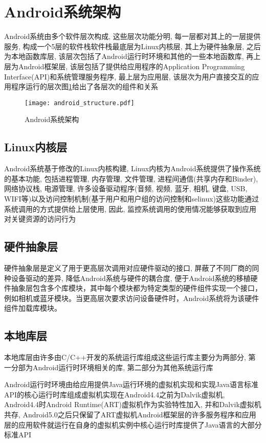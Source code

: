 \section{Android系统架构}
Android系统由多个软件层次构成, 这些层次功能分明, 每一层都对其上的一层提供服务, 构成一个5层的软件栈\juhao 软件栈最底层为Linux内核层, 其上为硬件抽象层, 之后为本地函数库层, 该层次包括了Android运行时环境和其他的一些本地函数库, 再上层为Android框架层, 该层包括了提供给应用程序的Application Programming Interface(API)和系统管理服务程序, 最上层为应用层, 该层次为用户直接交互的应用程序运行的层次\juhao  图\ref{androidStructure}给出了各层次的组件和关系\juhao
\begin{figure}[ht]
\centering
\texttt{[image: android\_structure.pdf]}
\caption{Android系统架构}
\label{androidStructure}
\end{figure}

\subsection*{Linux内核层} 
Android系统基于修改的Linux内核构建, Linux内核为Android系统提供了操作系统的基本功能, 包括进程管理, 内存管理, 文件管理, 进程间通信(共享内存和Binder), 网络协议栈, 电源管理, 许多设备驱动程序(音频, 视频, 蓝牙, 相机, 键盘, USB, WIFI等)以及访问控制机制(基于用户和用户组的访问控制和selinux)\juhao 这些功能通过系统调用的方式提供给上层使用, 因此, 监控系统调用的使用情况能够获取到应用对关键资源的访问行为\juhao

\subsection*{硬件抽象层}
硬件抽象层是定义了用于更高层次调用对应硬件驱动的接口, 屏蔽了不同厂商的同种设备驱动的差异, 降低Android系统与硬件的耦合度, 便于Android系统的移植\juhao 硬件抽象层包含多个库模块，其中每个模块都为特定类型的硬件组件实现一个接口，例如相机或蓝牙模块。当更高层次要求访问设备硬件时，Android系统将为该硬件组件加载库模块。

\subsection*{本地库层}
本地库层由许多由C/C++开发的系统运行库组成\juhao 这些运行库主要分为两部分, 第一分部为Android运行时环境相关的库, 第二部分为其他系统运行库\juhao 

Android运行时环境由给应用提供Java运行环境的虚拟机实现和实现Java语言标准API的核心运行时库组成\juhao 虚拟机实现在Android4.4之前为Dalvik虚拟机, Android4.4时Android Runtime(ART)虚拟机作为实验特性加入, 并和Dalvik虚拟机共存, Android5.0之后只保留了ART虚拟机\juhao Android框架层的许多服务程序和应用层的应用软件就运行在自身的虚拟机实例中\juhao 核心运行时库提供了Java语言的大部分标准API\juhao

